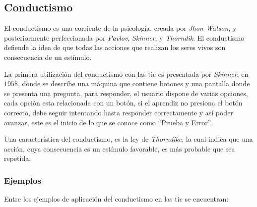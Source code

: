 \subsection{Conductismo}

El conductismo es una corriente de la psicología, creada por \textit{Jhon
    Watson}, y posteriormente perfeccionada por \textit{Pavlov},
\textit{Skinner}, y \textit{Thorndik}. El conductismo defiende la idea de que
todas las acciones que realizan los seres vivos son consecuencia de un
estímulo\cite{weegar2012comparison}.

La primera utilización del conductismo con las \Gls{tic} es presentada por
\textit{Skinner}, en $1958$\cite{weegar2012comparison}, donde se describe una
máquina que contiene botones y una pantalla donde se presenta una pregunta, para
responder, el usuario dispone de varias opciones, cada opción esta relacionada
con un botón, si el aprendiz no presiona el botón correcto, debe seguir
intentando hasta responder correctamente y así
poder avanzar\cite{weegar2012comparison}, este es el inicio de lo que se conoce como
\enquote{Prueba y Error}.

Una característica del conductismo, es la ley de \textit{Thorndike}, la cual
indica que una acción, cuya consecuencia es un estímulo favorable, es más
probable que sea repetida\cite{weegar2012comparison}.



\subsubsection{Ejemplos}
\label{sec:edutainment}

Entre los ejemplos de aplicación del conductismo en las \gls{tic} se encuentran:

